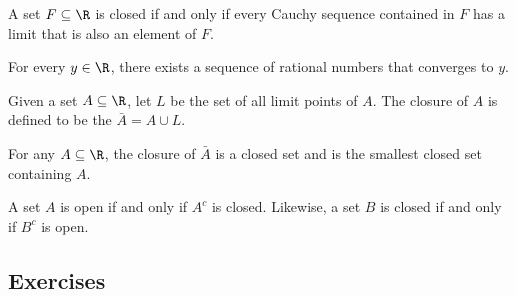 \begin{tcolorbox}
\begin{thm}
A set \( F \subseteq \R \) is closed if and only if every Cauchy sequence contained in \( F \) has a limit that is also an element of \( F \). 
\end{thm}
\end{tcolorbox}

\begin{tcolorbox}
\begin{thm}
For every \( y \in \R  \), there exists a sequence of rational numbers that converges to \( y \). 
\end{thm}
\end{tcolorbox}

\begin{tcolorbox}
\begin{defn}
    Given a set \( A \subseteq \R  \), let \( L \) be the set of all limit points of \( A \). The closure of \( A \) is defined to be the \( \bar{A} = A \cup L \). 
\end{defn}
\end{tcolorbox}


\begin{tcolorbox}
\begin{thm}
    For any \( A \subseteq \R  \), the closure of \( \bar{A} \) is a closed set and is the smallest closed set containing \( A \). 
\end{thm}
\end{tcolorbox}

\begin{tcolorbox}
\begin{thm}
A set \( A \) is open if and only if \( A^c \) is closed. Likewise, a set \( B \) is closed if and only if \( B^c \) is open. 
\end{thm}
\end{tcolorbox}


\subsection{Exercises}


